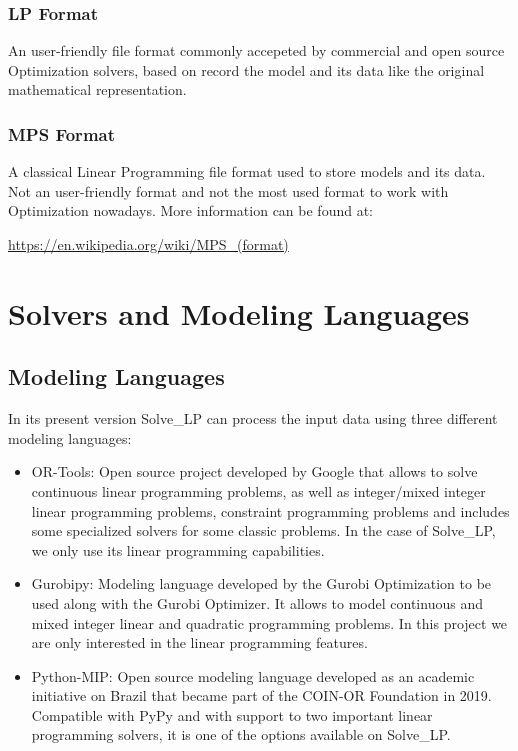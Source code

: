 \documentclass[12pt,hidelinks]{article}
\begin{document}
		\subsubsection{LP Format}
			An user-friendly file format commonly accepeted by commercial and open source Optimization solvers, based on record the model and its data like the original mathematical representation. 

		\subsubsection{MPS Format}
			A classical Linear Programming file format used to store models and its data. Not an user-friendly format and not the most used format to work with Optimization nowadays. More information can be found at: 
			
			\url{https://en.wikipedia.org/wiki/MPS_(format)}
\newpage


\section{Solvers and Modeling Languages}
\vspace{10.5cm}
	\subsection{Modeling Languages}
		In its present version Solve\_LP can process the input data using three different modeling languages:
		\begin{itemize}
			\item OR-Tools: Open source project developed by Google that allows to solve continuous linear programming problems, as well as integer/mixed integer linear programming problems, constraint programming problems and includes some specialized solvers for some classic problems. In the case of Solve\_LP, we only use its linear programming capabilities.
			\item Gurobipy: Modeling language developed by the Gurobi Optimization to be used along with the Gurobi Optimizer. It allows to model continuous and mixed integer linear and quadratic programming problems. In this project we are only interested in the linear programming features.
			\item Python-MIP: Open source modeling language developed as an academic initiative on Brazil that became part of the COIN-OR Foundation in 2019. Compatible with PyPy and with support to two important linear programming solvers, it is one of the options available on Solve\_LP.
		\end{itemize}
\end{document}
